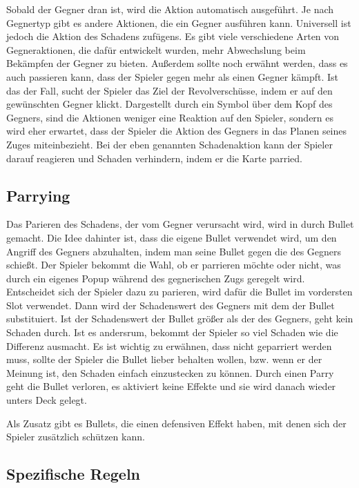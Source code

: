 Sobald der Gegner dran ist, wird die Aktion automatisch ausgeführt. Je nach Gegnertyp gibt es andere Aktionen,
die ein Gegner ausführen kann. Universell ist jedoch die Aktion des Schadens zufügens.
Es gibt viele verschiedene Arten von Gegneraktionen, die dafür entwickelt wurden, mehr Abwechslung beim Bekämpfen der Gegner zu bieten.
Außerdem sollte noch erwähnt werden, dass es auch passieren kann, dass der Spieler gegen mehr als einen Gegner kämpft.
Ist das der Fall, sucht der Spieler das Ziel der Revolverschüsse, indem er auf den gewünschten Gegner klickt.
Dargestellt durch ein Symbol über dem Kopf des Gegners, sind die Aktionen weniger eine Reaktion auf den Spieler,
sondern es wird eher erwartet, dass der Spieler die Aktion des Gegners in das Planen seines Zuges miteinbezieht.
Bei der eben genannten Schadenaktion kann der Spieler darauf reagieren und Schaden verhindern, indem er die Karte parried.

\subsection{Parrying}\label{parrying}
Das Parieren des Schadens, der vom Gegner verursacht wird, wird in \FF durch Bullet gemacht.
Die Idee dahinter ist, dass die eigene Bullet verwendet wird, um den Angriff des Gegners abzuhalten, indem man
seine Bullet gegen die des Gegners schießt.
Der Spieler bekommt die Wahl, ob er parrieren möchte oder nicht, was durch ein eigenes Popup während des gegnerischen Zugs geregelt wird.
Entscheidet sich der Spieler dazu zu parieren, wird dafür die Bullet im vordersten Slot verwendet.
Dann wird der Schadenswert des Gegners mit dem der Bullet substituiert. Ist der Schadenswert der Bullet größer als der des Gegners,
geht kein Schaden durch. Ist es andersrum, bekommt der Spieler so viel Schaden wie die Differenz ausmacht.
Es ist wichtig zu erwähnen, dass nicht geparriert werden muss, sollte der Spieler die Bullet lieber behalten wollen,
bzw. wenn er der Meinung ist, den Schaden einfach einzustecken zu können. Durch einen Parry geht die Bullet verloren,
es aktiviert keine Effekte und sie wird danach wieder unters Deck gelegt.


Als Zusatz gibt es Bullets, die einen defensiven Effekt haben, mit denen sich der Spieler zusätzlich schützen kann.

\subsection{Spezifische Regeln}\label{spezifische_regeln}

